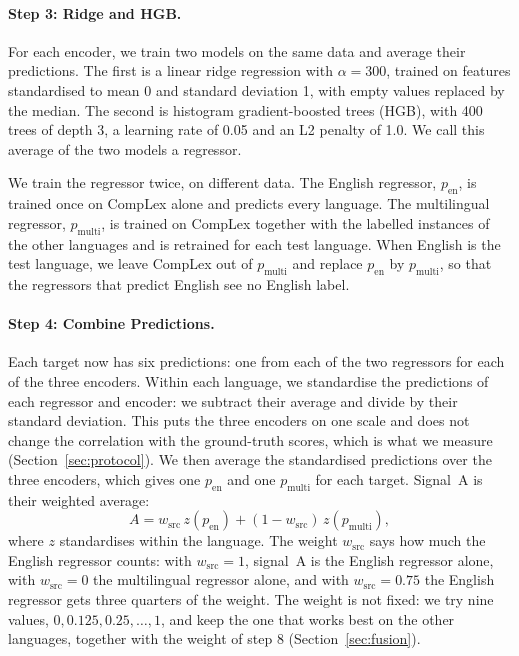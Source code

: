 \paragraph{Step 3: Ridge and HGB.} For each encoder, we train two models on the same data and %
average their predictions. The first is a linear ridge regression with $\alpha = 300$, trained on
features standardised to mean 0 and standard deviation 1, with empty values replaced by the median. %
The second is histogram gradient-boosted trees (HGB), with 400 trees of depth 3, a learning rate of %
0.05 and an L2 penalty of 1.0. We call this average of the two models a regressor.

We train the regressor twice, on different data. The English regressor, $p_{\mathrm{en}}$, is
trained once on CompLex alone and predicts every language. The multilingual regressor, %
$p_{\mathrm{multi}}$, is trained on CompLex together with the labelled instances of the other
languages and is retrained for each test language. When English is the test language, we leave %
CompLex out of $p_{\mathrm{multi}}$ and replace $p_{\mathrm{en}}$ by $p_{\mathrm{multi}}$, so that %
the regressors that predict English see no English label.

\paragraph{Step 4: Combine Predictions.} Each target now has six predictions: one from each of the
two regressors for each of the three encoders. Within each language, we standardise the predictions %
of each regressor and encoder: we subtract their average and divide by their standard deviation.
This puts the three encoders on one scale and does not change the correlation with the ground-truth scores,
which is what we measure (Section~\ref{sec:protocol}). We then average the standardised predictions
over the three encoders, which gives one $p_{\mathrm{en}}$ and one $p_{\mathrm{multi}}$ for each
target. Signal~A is their weighted average:
\begin{equation}
A = w_{\mathrm{src}}\, z(p_{\mathrm{en}}) + (1 - w_{\mathrm{src}})\, z(p_{\mathrm{multi}}),
\label{eq:arms}
\end{equation}
where $z$ standardises within the language. The weight $w_{\mathrm{src}}$ says how much the %
English regressor counts: with $w_{\mathrm{src}} = 1$, signal~A is the English regressor alone, with
$w_{\mathrm{src}} = 0$ the multilingual regressor alone, and with $w_{\mathrm{src}} = 0.75$ the
English regressor gets three quarters of the weight. The weight is not fixed: we try nine values,
$0, 0.125, 0.25, \dots, 1$, and keep the one that works best on the other languages, together with %
the weight of step 8 (Section~\ref{sec:fusion}).

